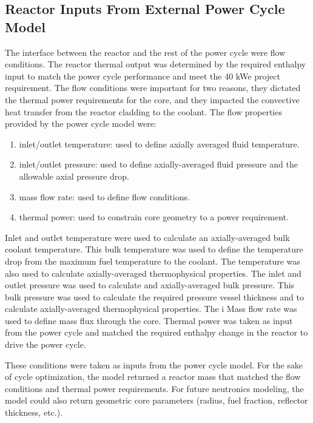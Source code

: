\subsection{Reactor Inputs From External Power Cycle Model}
The interface between the reactor and the rest of the power cycle were flow
conditions. The reactor thermal output was determined by the required enthalpy
input to match the power cycle performance and meet the 40 kWe project
requirement. The flow conditions were important for two reasons, they dictated
the thermal power requirements for the core, and they impacted the convective
heat transfer from the reactor cladding to the coolant. The flow properties
provided by the power cycle model were:

\begin{enumerate}
    \item inlet/outlet temperature: used to define axially averaged fluid
        temperature.
    \item inlet/outlet pressure: used to define axially-averaged fluid pressure
        and the allowable axial pressure drop.
    \item mass flow rate: used to define flow conditions.
    \item thermal power: used to constrain core geometry to a power requirement.
\end{enumerate}

Inlet and outlet temperature were used to calculate an axially-averaged bulk
coolant temperature. This bulk temperature was used to define the temperature
drop from the maximum fuel temperature to the coolant. The temperature was also
used to calculate axially-averaged thermophysical properties. The inlet and
outlet pressure was used to calculate and axially-averaged bulk pressure. This
bulk pressure was used to calculate the required pressure vessel thickness and
to calculate axially-averaged thermophysical properties. The i Mass flow rate was used
to define mass flux through the core. Thermal power was taken as input
from the power cycle and matched the required enthalpy change in the reactor to
drive the power cycle.

These conditions were taken as inputs from the power cycle model. For the sake of
cycle optimization, the model returned a reactor mass that matched the flow
conditions and thermal power requirements. For future neutronics modeling, the
model could also return geometric core parameters (radius, fuel fraction,
reflector thickness, etc.). 

